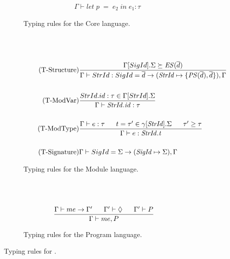 \begin{figure}[htbp]
\begin{subfigure}{\textwidth}
\begin{align*}
{\Gamma \vdash let\;p\;=\;e_{2}\;in\;e_{1}:\tau}
\end{align*}
\caption{Typing rules for the Core language. \label{fig:TypeRulesCore}}
\end{subfigure}
\\ \\
\begin{subfigure}{\textwidth}
\begin{align*}
\tag{T-Structure}
&\frac
{\Gamma[SigId].\Sigma \succeq \mathit{ES}(\overline{d})}
{\Gamma \vdash StrId : SigId = \overline{d} \rightarrow (\mathit{StrId} \mapsto \lbrace \mathit{PS}(\overline{d}), \overline{d}\rbrace),\Gamma}
\\
\\
\tag{T-ModVar}
&\frac
{StrId.id:\tau \in \Gamma[StrId].\Sigma}
{\Gamma \vdash \mathit{StrId.id} : \tau}
\\
\\
\tag{T-ModType}
&
\frac
{\Gamma \vdash e:\tau \;\;\;\;\;\; t = \tau' \in \gamma[\mathit{StrId}].\Sigma \;\;\;\;\;\; \tau' \geq \tau}
{\Gamma \vdash e : \mathit{StrId.t}}
\\
\\
\tag{T-Signature}
&\Gamma \vdash SigId = \Sigma \rightarrow (\mathit{SigId} \mapsto \Sigma),\Gamma
\end{align*}
\caption{Typing rules for the Module language. \label{fig:TypeRulesModule}}
\end{subfigure}
\\ \\
\begin{subfigure}{\textwidth}

\begin{align*}
&\frac
{\Gamma \vdash me \rightarrow \Gamma' \;\;\;\;\;\; \Gamma' \vdash \Diamond \;\;\;\;\;\; \Gamma' \vdash P}
{\Gamma \vdash me, P}
\end{align*}
\caption{Typing rules for the Program language. \label{fig:TypeRulesProgram}}
\end{subfigure}
\caption{Typing rules for \MiniML.}
\end{figure}


